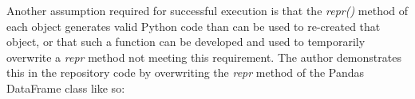 Another assumption required for successful execution is that the \textit{repr()} method
 of each object generates valid Python code than can be used to re-created that
 object, or that such a function can be developed and used to temporarily
 overwrite a \textit{repr\(\)} method not meeting this requirement.  The author demonstrates
 this in the repository code by overwriting the \textit{repr\(\)} method of the
 Pandas DataFrame class like so:

 
 
